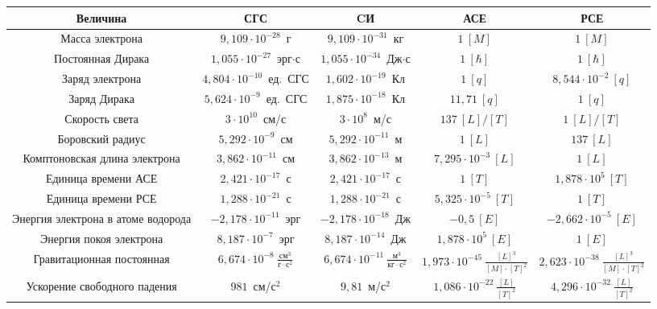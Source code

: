 \documentclass[10pt,a4paper]{extarticle}
\begin{document}
  \begin{table}[h!]
    \center
    \begin{tabular}{|*{5}{C{.18}|}} \hline
        \textbf{Величина} & \textbf{СГС} & \textbf{CИ} & \textbf{АСЕ} &
          \textbf{РСЕ} \\ \hline
        Масса электрона & \( 9,\!109 \cdot 10^{-28} \)~г &
          \( 9,\!109 \cdot 10^{-31} \)~кг & \( 1~[M] \) & \( 1~[M] \) \\ \hline
        Постоянная Дирака & \( 1,\!055 \cdot 10^{-27} \)~эрг\( \cdot \)с &
          \( 1,\!055 \cdot 10^{-34} \)~Дж\( \cdot \)с & \( 1~[\hbar] \) &
          \( 1~[\hbar] \) \\ \hline
        Заряд электрона & \( 4,\!804 \cdot 10^{-10} \)~ед.~СГС &
          \( 1,\!602 \cdot 10^{-19} \)~Кл & \( 1~[q] \) &
          \( 8,\!544 \cdot 10^{-2}~[q] \) \\ \hline
        Заряд Дирака & \( 5,\!624 \cdot 10^{-9} \)~ед.~СГС &
          \( 1,\!875 \cdot 10^{-18} \)~Кл & \( 11,\!71~[q] \) &
          \( 1~[q] \) \\ \hline
        Скорость света & \( 3 \cdot 10^{10} \)~см/с & \( 3 \cdot 10^{8} \)~м/с &
          \( 137~[L]/[T] \) & \( 1~[L]/[T] \) \\ \hline
        Боровский радиус & \( 5,\!292 \cdot 10^{-9} \)~см &
          \( 5,\!292 \cdot 10^{-11} \)~м & \( 1~[L] \) &
          \( 137~[L] \) \\ \hline
        Комптоновская длина электрона & \( 3,\!862 \cdot 10^{-11} \)~см &
          \( 3,\!862 \cdot 10^{-13} \)~м & \( 7,\!295 \cdot 10^{-3}~[L] \) &
          \( 1~[L] \) \\ \hline
        Единица времени АСЕ & \( 2,\!421 \cdot 10^{-17} \)~с &
          \( 2,\!421 \cdot 10^{-17} \)~с & \( 1~[T] \) &
          \( 1,\!878 \cdot 10^5~[T] \) \\ \hline
        Единица времени РСЕ & \( 1,\!288 \cdot 10^{-21} \)~с &
          \( 1,\!288 \cdot 10^{-21} \)~с & \( 5,\!325 \cdot 10^{-5}~[T] \) &
          \( 1~[T] \) \\ \hline
        Энергия электрона в атоме водорода & \( -2,\!178 \cdot 10^{-11} \)~эрг &
          \( -2,\!178 \cdot 10^{-18} \)~Дж & \( -0,\!5~[E] \) &
          \( -2,\!662 \cdot 10^{-5}~[E] \) \\ \hline
        Энергия покоя электрона & \( 8,\!187 \cdot 10^{-7} \)~эрг &
          \( 8,\!187 \cdot 10^{-14} \)~Дж & \( 1,\!878 \cdot 10^5~[E] \) &
          \( 1~[E] \) \\ \hline
        Гравитационная постоянная & \( 6,\!674 \cdot 10^{-8}~\frac{\text{см}^3}
          {\text{г} \cdot \text{с}^2} \) &
          \( 6,\!674 \cdot 10^{-11}~\frac{\text{м}^3}
          {\text{кг} \cdot \text{с}^2} \) &
          \( 1,\!973 \cdot 10^{-45}~\frac{[L]^3}{[M] \cdot [T]^2} \) &
          \( 2,\!623 \cdot 10^{-38}~\frac{[L]^3}{[M] \cdot [T]^2} \) \\ \hline
        Ускорение свободного падения & \( 981 \)~см/с\(^2\) &
          \( 9,\!81 \)~м/с\(^2\) &
          \( 1,\!086 \cdot 10^{-22}~\frac{[L]}{[T]^2} \) &
          \( 4,\!296 \cdot 10^{-32}~\frac{[L]}{[T]^2} \) \\ \hline
    \end{tabular}
  \end{table}
\end{document}
